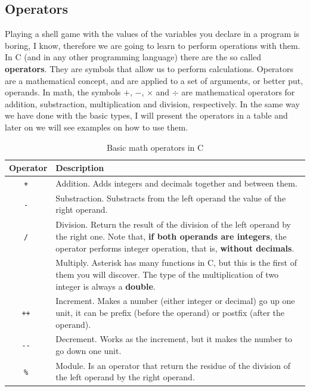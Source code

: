 \documentclass[a4paper]{article}
\begin{document}
\subsection{Operators}
Playing a shell game with the values of the variables you declare in a program
is boring, I know, therefore we are going to learn to perform operations with
them. In C (and in any other programming language) there are the so called
\textbf{operators}. They are symbols that allow us to perform calculations.
Operators are a mathematical concept, and are applied to a set of arguments, or
better put, operands. In math, the symbols $+$, $-$, $\times$ and $\div$ are
mathematical operators for addition, substraction, multiplication and division,
respectively. In the same way we have done with the basic types, I will present
the operators in a table and later on we will see examples on how to use them.

\begin{table}[H]
\centering
\begin{tabularx}{\linewidth}{|c|Y|}
\hline
\bf Operator & \bf Description \\ \hline
\tt + & Addition. Adds integers and decimals together and between them. \\\hline
\tt - & Substraction. Substracts from the left operand the value of the right operand. \\\hline
\tt / & Division. Return the result of the division of the left operand by the right one. Note that, \textbf{if both operands are integers}, the operator performs integer operation, that is, \textbf{without decimals}. \\\hline
\tt * & Multiply. Asterisk has many functions in C, but this is the first of them you will discover. The type of the multiplication of two integer is always a \textbf{double}.\\\hline
\tt ++ & Increment. Makes a number (either integer or decimal) go up one unit, it can be prefix (before the operand) or postfix (after the operand).\\\hline
\tt -{}- & Decrement. Works as the increment, but it makes the number to go down one unit. \\\hline
\tt \% & Module. Is an operator that return the residue of the division of the left operand by the right operand. \\\hline
\end{tabularx}
\caption{Basic math operators in C}
\label{tab:mathOperators}
\end{table}
\end{document}
